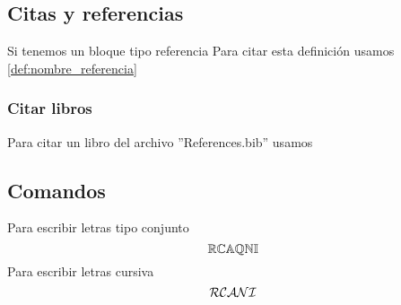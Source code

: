 \subsection{Citas y referencias}
Si tenemos un bloque tipo referencia
Para citar esta definición usamos \ref{def:nombre_referencia}
\subsubsection{Citar libros}
Para citar un libro del archivo ''References.bib'' usamos \cite{arnold-1989}

\subsection{Comandos}
Para escribir letras tipo conjunto
$$\mathbb R \mathbb C \mathbb A \mathbb Q \mathbb N \mathbb I$$
Para escribir letras cursiva
$$\mathcal R \mathcal C \mathcal A \mathcal N \mathcal I$$